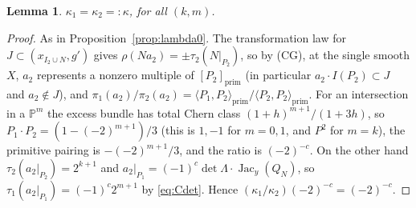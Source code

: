 \documentclass[10pt]{article}
\numberwithin{equation}{section}
\newtheorem{lemma}[theorem]{Lemma}
\theoremstyle{remark}
\newcommand{\PP}{\mathbb{P}}
\begin{document}
\begin{lemma}\label{lem:kappa}
$\kappa_1=\kappa_2=:\kappa$, for all $(k,m)$.
\end{lemma}
\begin{proof}
As in Proposition~\ref{prop:lambda0}. The transformation law for $J\subset(x_{I_2\cup N},g')$ gives
$\rho(Na_2)=\pm\tau_2(N|_{P_2})$, so by (CG), at the single smooth $X$, $a_2$ represents a nonzero multiple of
$[P_2]_{\mathrm{prim}}$ (in particular $a_2\cdot I(P_2)\subset J$ and $a_2\notin J$), and
$\pi_1(a_2)/\pi_2(a_2)=\langle P_1,P_2\rangle_{\mathrm{prim}}/\langle P_2,P_2\rangle_{\mathrm{prim}}$. For an
intersection in a $\PP^m$ the excess bundle has total Chern class $(1+h)^{m+1}/(1+3h)$, so
$P_1\cdot P_2=(1-(-2)^{m+1})/3$ (this is $1,-1$ for $m=0,1$, and $P^2$ for $m=k$), the primitive pairing is
$-(-2)^{m+1}/3$, and the ratio is $(-2)^{-c}$. On the other hand $\tau_2(a_2|_{P_2})=2^{k+1}$ and
$a_2|_{P_1}=(-1)^c\det\Lambda\cdot\operatorname{Jac}_y(Q_N)$, so $\tau_1(a_2|_{P_1})=(-1)^c2^{m+1}$ by
\eqref{eq:Cdet}. Hence $(\kappa_1/\kappa_2)(-2)^{-c}=(-2)^{-c}$.
\end{proof}
\end{document}
